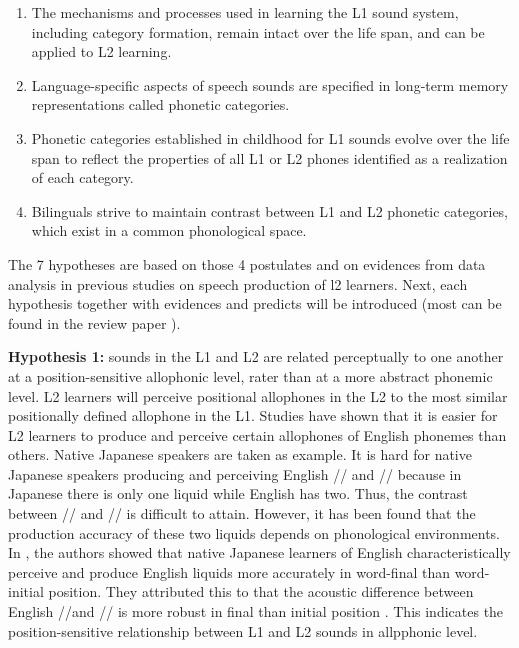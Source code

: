 \begin{enumerate}
\item The mechanisms and processes used in learning the L1 sound system, including category formation, remain intact over the life span, and can be applied to L2 learning.
\item Language-specific aspects of speech sounds are specified in long-term memory representations called phonetic categories.
\item Phonetic categories established in childhood for L1 sounds evolve over the life span to reflect the properties of all L1 or L2 phones identified as a realization of each category.
\item Bilinguals strive to maintain contrast between L1 and L2 phonetic categories, which exist in a common phonological space.
\end{enumerate}

The 7 hypotheses are based on those 4 postulates and on evidences from data analysis in previous studies on speech production of l2 learners. Next, each hypothesis together with evidences and predicts will be introduced (most can be found in the review paper \cite{flege1995second}).

\textbf{Hypothesis 1:} sounds in the L1 and L2 are related perceptually to one another at a position-sensitive allophonic level, rater than at a more abstract phonemic level. L2 learners will perceive positional allophones in the L2 to the most similar positionally defined allophone in the L1. Studies have shown that it is easier for L2 learners to produce and perceive certain allophones of English phonemes than others. Native Japanese speakers are taken as example. It is hard for native Japanese speakers producing and perceiving English // and // because in Japanese there is only one liquid while English has two. Thus, the contrast between // and // is difficult to attain. However, it has been found that the production accuracy of these two liquids depends on phonological environments. In \citep{strange1992learning}, the authors showed that native Japanese learners of English characteristically perceive and produce English liquids more accurately in word-final than word-initial position. They attributed this to that the acoustic difference between English //and // is more robust in final than initial position \citep{sheldon1982acquisition}. This indicates the position-sensitive relationship between L1 and L2 sounds in allpphonic level.

